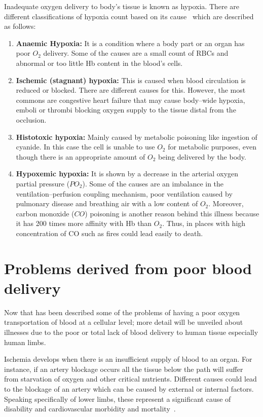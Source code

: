 Inadequate oxygen delivery to body's tissue is known as hypoxia. There are different classifications of hypoxia count based on its cause~\cite{marieb2007human} which are described as follows: 

\begin{enumerate}
    \item \textbf{Anaemic Hypoxia:} It is a condition where a body part or an organ has poor $O_2$ delivery. Some of the causes are a small count of RBCs and abnormal or too little Hb content in the blood's cells.
    \item \textbf{Ischemic (stagnant) hypoxia: }This is caused when blood circulation is reduced or blocked. There are different causes for this. However, the most commons are congestive heart failure that may cause body–wide hypoxia, emboli or thrombi blocking oxygen supply to the tissue distal from the occlusion. 
    \item \textbf{Histotoxic hypoxia: }Mainly caused by metabolic poisoning like ingestion of cyanide. In this case the cell is unable to use $O_2$ for metabolic purposes, even though there is an appropriate amount of $O_2$ being delivered by the body.
    \item \textbf{Hypoxemic hypoxia:} It is shown by a decrease in the arterial oxygen partial pressure ($PO_2$). Some of the causes are an imbalance in the ventilation–perfusion coupling mechanism, poor ventilation caused by pulmonary disease and breathing air with a low content of $O_2$. Moreover, carbon monoxide ($CO$) poisoning is another reason behind this illness because it has \num{200} times more affinity with Hb than $O_2$. Thus, in places with high concentration of CO such as fires could lead easily to death.
\end{enumerate}




\section{Problems derived from poor blood delivery} %
\label{section literature 3}
Now that has been described some of the problems of having a poor oxygen transportation of blood at a cellular level; more detail will be unveiled about illnesses due to the poor or total lack of blood delivery to human tissue especially human limbs. 

Ischemia develops when there is an insufficient supply of blood to an organ. For instance, if an artery blockage occurs all the tissue below the path will suffer from starvation of oxygen and other critical nutrients. Different causes could lead to the blockage of an artery which can be caused by external or internal factors. Speaking specifically of lower limbs, these represent a significant cause of disability and cardiovascular morbidity and mortality~\cite{novo1995patients}. 


